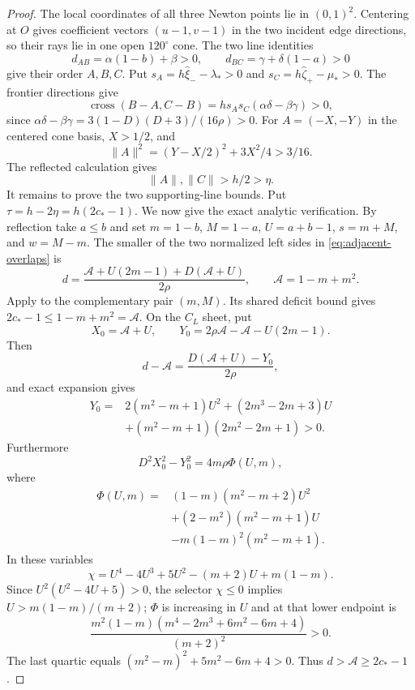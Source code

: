 \begin{proof}
The local coordinates of all three Newton points lie in $(0,1)^2$.
Centering at $O$ gives coefficient vectors $(u-1,v-1)$ in the two incident
edge directions, so their rays lie in one open $120^\circ$ cone. The two
line identities
\[
 d_{AB}=\alpha(1-b)+\beta>0,\qquad
 d_{BC}=\gamma+\delta(1-a)>0
\]
give their order $A,B,C$. Put
$s_A=h\widehat\xi_- -\lambda_*>0$ and
$s_C=h\widehat\zeta_+ -\mu_*>0$. The frontier directions give
\[
 \operatorname{cross}(B-A,C-B)
 =h s_A s_C(\alpha\delta-\beta\gamma)>0,
\]
since
$\alpha\delta-\beta\gamma=3(1-D)(D+3)/(16\rho)>0$.
For $A=(-X,-Y)$ in the centered cone basis, $X>1/2$, and
\[
 \|A\|^2=(Y-X/2)^2+3X^2/4>3/16.
\]
The reflected calculation gives
\begin{equation}
 \|A\|,\|C\|>h/2>\eta.\label{eq:outer-radii}
\end{equation}
It remains to prove the two supporting-line bounds. Put
$\tau=h-2\eta=h(2c_*-1)$.
We now give the exact analytic verification.  By reflection take $a\le b$ and
set $m=1-b$, $M=1-a$, $U=a+b-1$, $s=m+M$, and $w=M-m$.  The smaller of the
two normalized left sides in \eqref{eq:adjacent-overlaps} is
\begin{equation}
 d=\frac{\mathcal A+U(2m-1)+D(\mathcal A+U)}{2\rho},
 \qquad \mathcal A=1-m+m^2.                      \label{eq:adjacent-d}
\end{equation}
Apply  to the complementary pair $(m,M)$.
Its shared deficit bound gives
$2c_*-1\le1-m+m^2=\mathcal A$. On the $C_L$ sheet, put
\[
 X_0=\mathcal A+U,
 \qquad
 Y_0=2\rho\mathcal A-\mathcal A-U(2m-1).
\]
Then
\[
 d-\mathcal A=\frac{D(\mathcal A+U)-Y_0}{2\rho},
\]
and exact expansion gives
\[
\begin{aligned}
 Y_0={}&2(m^2-m+1)U^2+(2m^3-2m+3)U\\
      &+(m^2-m+1)(2m^2-2m+1)>0.
\end{aligned}
\]
Furthermore
\[
 D^2X_0^2-Y_0^2=4m\rho\Phi(U,m),
\]
where
\[
\begin{aligned}
 \Phi(U,m)={}&(1-m)(m^2-m+2)U^2\\
 &+(2-m^2)(m^2-m+1)U\\
 &-m(1-m)^2(m^2-m+1).
\end{aligned}
\]
In these variables
\[
 \chi=U^4-4U^3+5U^2-(m+2)U+m(1-m).
\]
Since $U^2(U^2-4U+5)>0$, the selector $\chi\le0$ implies
$U>m(1-m)/(m+2)$; $\Phi$ is increasing in $U$ and at that lower endpoint is
\[
 \frac{m^2(1-m)(m^4-2m^3+6m^2-6m+4)}{(m+2)^2}>0.
\]
The last quartic equals $(m^2-m)^2+5m^2-6m+4>0$.
Thus $d>\mathcal A\ge2c_*-1$.


\end{proof}

